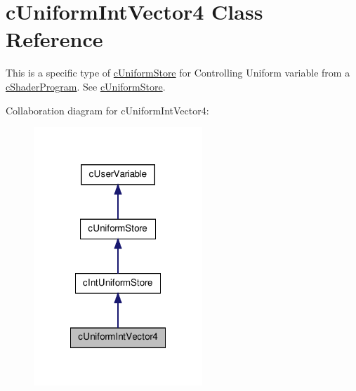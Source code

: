 \hypertarget{classc_uniform_int_vector4}{
\section{cUniformIntVector4 Class Reference}
\label{classc_uniform_int_vector4}
}


This is a specific type of \hyperlink{classc_uniform_store}{cUniformStore} for Controlling Uniform variable from a \hyperlink{classc_shader_program}{cShaderProgram}. See \hyperlink{classc_uniform_store}{cUniformStore}.  




Collaboration diagram for cUniformIntVector4:\nopagebreak
\begin{figure}[H]
\begin{center}
\leavevmode
\includegraphics[width=180pt]{classc_uniform_int_vector4__coll__graph}
\end{center}
\end{figure}
